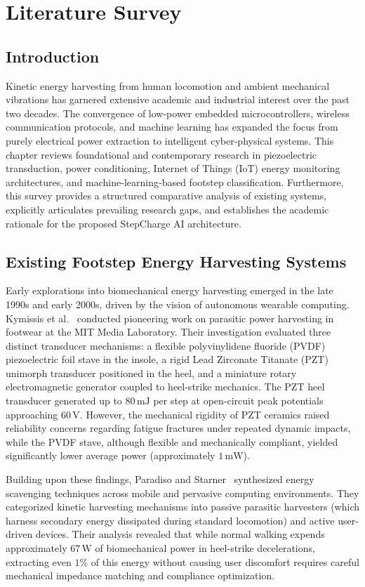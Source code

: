 \chapter{Literature Survey}

\section{Introduction}
Kinetic energy harvesting from human locomotion and ambient mechanical vibrations has garnered extensive academic and industrial interest over the past two decades. The convergence of low-power embedded microcontrollers, wireless communication protocols, and machine learning has expanded the focus from purely electrical power extraction to intelligent cyber-physical systems. This chapter reviews foundational and contemporary research in piezoelectric transduction, power conditioning, Internet of Things (IoT) energy monitoring architectures, and machine-learning-based footstep classification. Furthermore, this survey provides a structured comparative analysis of existing systems, explicitly articulates prevailing research gaps, and establishes the academic rationale for the proposed StepCharge AI architecture.

\section{Existing Footstep Energy Harvesting Systems}
Early explorations into biomechanical energy harvesting emerged in the late 1990s and early 2000s, driven by the vision of autonomous wearable computing. Kymissis et al.~\cite{kymissis1998parasitic} conducted pioneering work on parasitic power harvesting in footwear at the MIT Media Laboratory. Their investigation evaluated three distinct transducer mechanisms: a flexible polyvinylidene fluoride (PVDF) piezoelectric foil stave in the insole, a rigid Lead Zirconate Titanate (PZT) unimorph transducer positioned in the heel, and a miniature rotary electromagnetic generator coupled to heel-strike mechanics. The PZT heel transducer generated up to $80\,\text{mJ}$ per step at open-circuit peak potentials approaching $60\,\text{V}$. However, the mechanical rigidity of PZT ceramics raised reliability concerns regarding fatigue fractures under repeated dynamic impacts, while the PVDF stave, although flexible and mechanically compliant, yielded significantly lower average power (approximately $1\,\text{mW}$).

Building upon these findings, Paradiso and Starner~\cite{paradiso2005energy} synthesized energy scavenging techniques across mobile and pervasive computing environments. They categorized kinetic harvesting mechanisms into passive parasitic harvesters (which harness secondary energy dissipated during standard locomotion) and active user-driven devices. Their analysis revealed that while normal walking expends approximately $67\,\text{W}$ of biomechanical power in heel-strike decelerations, extracting even $1\%$ of this energy without causing user discomfort requires careful mechanical impedance matching and compliance optimization.

